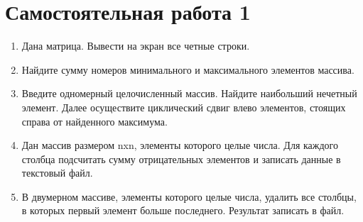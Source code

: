 \section{Самостоятельная работа 1}
\begin{enumerate}[leftmargin=*]
    \item Дана матрица. Вывести на экран все четные строки.
    \item Найдите сумму номеров минимального и максимального элементов массива.
    \item Введите одномерный целочисленный массив. Найдите наибольший нечетный элемент. Далее осуществите циклический сдвиг влево элементов, стоящих справа от найденного максимума.
    \item Дан массив размером nxn, элементы которого целые числа. Для каждого столбца подсчитать сумму отрицательных элементов и записать данные в текстовый файл.
    \item В двумерном массиве, элементы которого целые числа, удалить все столбцы, в которых первый элемент больше последнего. Результат записать в файл.
\end{enumerate}